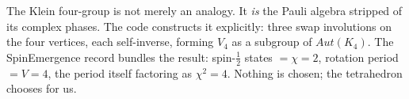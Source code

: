 \documentclass[11pt,a4paper]{book}
\def\mathrm#1{#1}%
\def\texttt#1{#1}%
\begin{document}
\begin{code}
%
\\[\AgdaEmptyExtraSkip]%
\>[0]\AgdaSpace{}%
\AgdaSymbol{:}\AgdaSpace{}%
\<%
\\
\>[0]\AgdaSpace{}%
\AgdaSymbol{=}\AgdaSpace{}%
\<%
\\
\>[0][@{}l@{\AgdaIndent{0}}]%
\>[2]\AgdaSymbol{\{}\AgdaSpace{}%
%
\>[7]\AgdaSymbol{=}\AgdaSpace{}%
\AgdaSpace{}%
\AgdaSpace{}%
\AgdaSpace{}%
\<%
\\
%
\>[2]\AgdaSymbol{;}\AgdaSpace{}%
\AgdaSpace{}%
\AgdaSymbol{=}\AgdaSpace{}%
\<%
\\
%
\>[2]\AgdaSymbol{;}\AgdaSpace{}%
\AgdaSpace{}%
\AgdaSymbol{=}\AgdaSpace{}%
\<%
\\
%
\>[2]\AgdaSymbol{;}\AgdaSpace{}%
\AgdaSpace{}%
\AgdaSymbol{=}\AgdaSpace{}%
\<%
\\
%
\>[2]\AgdaSymbol{;}\AgdaSpace{}%
%
\>[18]\AgdaSymbol{=}\AgdaSpace{}%
\AgdaSpace{}%
\AgdaSpace{}%
\AgdaSpace{}%
\<%
\\
%
\>[2]\AgdaSymbol{;}\AgdaSpace{}%
\AgdaSpace{}%
\AgdaSymbol{=}\AgdaSpace{}%
\<%
\\
%
\>[2]\AgdaSymbol{;}\AgdaSpace{}%
\AgdaSpace{}%
\AgdaSymbol{=}\AgdaSpace{}%
\<%
\\
%
\>[2]\AgdaSymbol{;}\AgdaSpace{}%
\AgdaSpace{}%
\AgdaSymbol{=}\AgdaSpace{}%
\AgdaSpace{}%
\AgdaSymbol{\}}\<%
\\
%
\\[\AgdaEmptyExtraSkip]%
\>[0]\<%
\end{code}

The Klein four-group is not merely an analogy. It \emph{is} the Pauli algebra stripped of its complex phases. The code constructs it explicitly: three swap involutions on the four vertices, each self-inverse, forming $V_4$ as a subgroup of $\mathrm{Aut}(K_4)$. The \texttt{SpinEmergence} record bundles the result: spin-$\frac{1}{2}$ states $= \chi = 2$, rotation period $= V = 4$, the period itself factoring as $\chi^2 = 4$. Nothing is chosen; the tetrahedron chooses for us.
\end{document}
